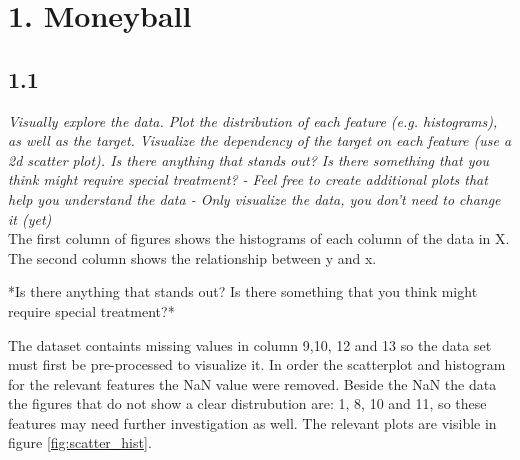 


\section{1. Moneyball}
\subsection{1.1}

{\it Visually explore the data. Plot the distribution of each feature (e.g. histograms), as well as the target. Visualize the dependency of the target on each feature (use a 2d scatter plot). Is there anything that stands out? Is there something that you think might require special treatment?
- Feel free to create additional plots that help you understand the data
- Only visualize the data, you don't need to change it (yet)} \\

The first column of figures shows the histograms of each column of the data in X. 
The second column shows the relationship between y and x. 

*Is there anything that stands out? Is there something that you think might require special treatment?*

The dataset containts missing values in column 9,10, 12 and 13 so the data set must first be pre-processed to visualize it. In order the scatterplot and histogram for the relevant features the NaN value were removed.
Beside the NaN the data the figures that do not show a clear distrubution are: 1, 8, 10 and 11, so these features may need further investigation as well. The relevant plots are visible in figure \ref{fig:scatter_hist}.\\

